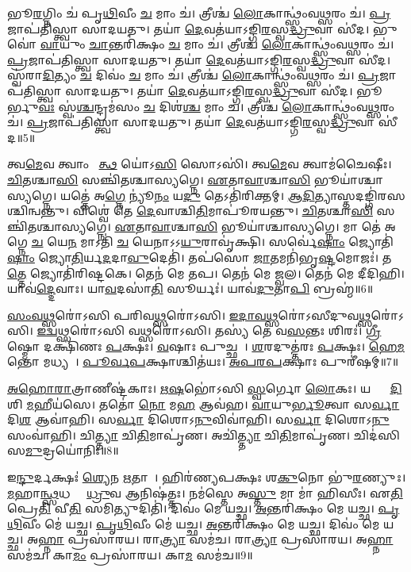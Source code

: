    𑌭𑍂\ul{𑌰}𑌗𑍍𑌨𑌿𑌂 𑌚॑ 𑌪𑍃\ul{𑌥𑌿}𑌵𑍀𑌂 \ul{𑌚} 𑌮𑌾𑌂 𑌚॑।
   𑌤𑍍𑌰𑍀𑌶𑍍𑌚॑ \ul{𑌲𑍋}𑌕𑌾𑌨𑍍𑌥𑍍𑌸𑌂॑𑌵\ul{𑌥𑍍𑌸}𑌰𑌂 𑌚॑।
   \ul{𑌪𑍍𑌰}𑌜𑌾𑌪॑𑌤𑌿𑌸𑍍𑌤𑍍𑌵𑌾 𑌸𑌾𑌦𑌯𑌤𑍁।
   𑌤𑌯𑌾॑ \ul{𑌦𑍇}𑌵𑌤॑𑌯𑌾𑌽𑌙𑍍𑌗𑌿\ul{𑌰}𑌸𑍍𑌵\ul{𑌦𑍍𑌧𑍍𑌰𑍁}𑌵𑌾 𑌸𑍀॑𑌦।
   𑌭𑍁𑌵𑍋॑ \ul{𑌵𑌾}𑌯𑍁𑌂 \ul{𑌚𑌾}𑌨𑍍𑌤𑌰𑌿॑𑌕𑍍𑌷𑌂 \ul{𑌚} 𑌮𑌾𑌂 𑌚॑।
   𑌤𑍍𑌰𑍀𑌶𑍍𑌚॑ \ul{𑌲𑍋}𑌕𑌾𑌨𑍍𑌥𑍍𑌸𑌂॑𑌵\ul{𑌥𑍍𑌸}𑌰𑌂 𑌚॑।
   \ul{𑌪𑍍𑌰}𑌜𑌾𑌪॑𑌤𑌿𑌸𑍍𑌤𑍍𑌵𑌾 𑌸𑌾𑌦𑌯𑌤𑍁।
   𑌤𑌯𑌾॑ \ul{𑌦𑍇}𑌵𑌤॑𑌯𑌾𑌽𑌙𑍍𑌗𑌿\ul{𑌰}𑌸𑍍𑌵\ul{𑌦𑍍𑌧𑍍𑌰𑍁}𑌵𑌾 𑌸𑍀॑𑌦।
   𑌸𑍍𑌵॑𑌰𑌾\ul{𑌦𑌿}𑌤𑍍𑌯𑌂 \ul{𑌚} 𑌦𑌿𑌵𑌂॑ \ul{𑌚} 𑌮𑌾𑌂 𑌚॑।
   𑌤𑍍𑌰𑍀𑌶𑍍𑌚॑ \ul{𑌲𑍋}𑌕𑌾𑌨𑍍𑌥𑍍𑌸𑌂॑𑌵\ul{𑌥𑍍𑌸}𑌰𑌂 𑌚॑।
   \ul{𑌪𑍍𑌰}𑌜𑌾𑌪॑𑌤𑌿𑌸𑍍𑌤𑍍𑌵𑌾 𑌸𑌾𑌦𑌯𑌤𑍁।
   𑌤𑌯𑌾॑ \ul{𑌦𑍇}𑌵𑌤॑𑌯𑌾𑌽𑌙𑍍𑌗𑌿\ul{𑌰}𑌸𑍍𑌵\ul{𑌦𑍍𑌧𑍍𑌰𑍁}𑌵𑌾 𑌸𑍀॑𑌦।
   𑌭𑍂𑌰𑍍𑌭𑍁\ul{𑌵𑌃} 𑌸𑍍𑌵॑\ul{𑌶𑍍𑌚}𑌨𑍍𑌦𑍍𑌰𑌮॑𑌸𑌂 \ul{𑌚} 𑌦𑌿𑌶॑\ul{𑌶𑍍𑌚} 𑌮𑌾𑌂 𑌚॑।
   𑌤𑍍𑌰𑍀𑌶𑍍𑌚॑ \ul{𑌲𑍋}𑌕𑌾𑌨𑍍𑌥𑍍𑌸𑌂॑𑌵\ul{𑌥𑍍𑌸}𑌰𑌂 𑌚॑।
   \ul{𑌪𑍍𑌰}𑌜𑌾𑌪॑𑌤𑌿𑌸𑍍𑌤𑍍𑌵𑌾 𑌸𑌾𑌦𑌯𑌤𑍁।
   𑌤𑌯𑌾॑ \ul{𑌦𑍇}𑌵𑌤॑𑌯𑌾𑌽𑌙𑍍𑌗𑌿\ul{𑌰}𑌸𑍍𑌵\ul{𑌦𑍍𑌧𑍍𑌰𑍁}𑌵𑌾 𑌸𑍀॑𑌦॥5॥
   \anuvakamend
   
   𑌤𑍍𑌵\ul{𑌮𑍇}𑌵 𑌤𑍍𑌵𑌾𑌂 𑌵𑍇᳚\ul{𑌤𑍍𑌥} 𑌯𑍋॑𑌽\ul{𑌸𑌿} 𑌸𑍋𑌽𑌸𑌿॑।
   𑌤𑍍𑌵\ul{𑌮𑍇}𑌵 𑌤𑍍𑌵𑌾𑌮॑𑌚𑍈𑌷𑍀𑌃।
   \ul{𑌚𑌿}𑌤𑌶𑍍𑌚𑌾\ul{𑌸𑌿} 𑌸𑌞𑍍𑌚𑌿॑𑌤𑌶𑍍𑌚𑌾𑌸𑍍𑌯𑌗𑍍𑌨𑍇।
   \ul{𑌏}𑌤𑌾\ul{𑌵𑌾}\ul{}𑌶𑍍𑌚𑌾\ul{𑌸𑌿} 𑌭𑍂𑌯𑌾॑𑌶𑍍𑌚𑌾𑌸𑍍𑌯𑌗𑍍𑌨𑍇।
   𑌯𑌤𑍍𑌤𑍇॑ 𑌅\ul{𑌗𑍍𑌨𑍇} 𑌨𑍍𑌯𑍂॑\ul{𑌨𑌂} 𑌯\ul{𑌦𑍁} 𑌤𑍇𑌽𑌤𑌿॑𑌰𑌿𑌕𑍍𑌤𑌮𑍍।
   \ul{𑌆}\ul{𑌦𑌿}𑌤𑍍𑌯𑌾𑌸𑍍𑌤𑌦𑌙𑍍𑌗𑌿॑𑌰𑌸\-𑌶𑍍𑌚𑌿𑌨𑍍𑌵𑌨𑍍𑌤𑍁।
   𑌵𑌿𑌶𑍍𑌵𑍇॑ 𑌤𑍇 \ul{𑌦𑍇}𑌵𑌾𑌶𑍍𑌚𑌿\ul{𑌤𑌿}𑌮𑌾𑌪𑍂॑𑌰𑌯𑌨𑍍𑌤𑍁।
   \ul{𑌚𑌿}𑌤𑌶𑍍𑌚𑌾\ul{𑌸𑌿} 𑌸𑌞𑍍𑌚𑌿॑𑌤𑌶𑍍𑌚𑌾𑌸𑍍𑌯𑌗𑍍𑌨𑍇।
   \ul{𑌏}𑌤𑌾\ul{𑌵𑌾}\ul{}𑌶𑍍𑌚𑌾\ul{𑌸𑌿} 𑌭𑍂𑌯𑌾॑𑌶𑍍𑌚𑌾𑌸𑍍𑌯𑌗𑍍𑌨𑍇।
   𑌮𑌾 𑌤𑍇॑ 𑌅𑌗𑍍𑌨𑍇 \ul{𑌚} 𑌯𑍇\ul{𑌨} 𑌮𑌾𑌽𑌤𑌿॑ \ul{𑌚} 𑌯𑍇𑌨𑌾𑌽𑌽\ul{𑌯𑍁}𑌰𑌾𑌵𑍃॑𑌕𑍍𑌷𑌿।
   𑌸𑌰𑍍𑌵𑍇॑\ul{𑌷𑌾𑌂} 𑌜𑍍𑌯𑍋𑌤𑌿॑\ul{𑌷𑌾𑌂} 𑌜𑍍𑌯𑍋\ul{𑌤𑌿}𑌰𑍍𑌯\ul{𑌦}𑌦𑌾\ul{𑌵𑍁}𑌦𑍇𑌤𑌿॑।
   𑌤𑌪॑𑌸𑍋 \ul{𑌜𑌾}𑌤𑌮𑌨𑌿॑𑌭𑍃\ul{𑌷𑍍𑌟}𑌮𑍋𑌜𑌃॑।
   𑌤\ul{𑌤𑍍𑌤𑍇} 𑌜𑍍𑌯𑍋𑌤𑌿॑𑌰𑌿𑌷𑍍𑌟𑌕𑍇।
   𑌤𑍇𑌨॑ 𑌮𑍇 𑌤𑌪।
   𑌤𑍇𑌨॑ 𑌮𑍇 𑌜𑍍𑌵𑌲।
   𑌤𑍇𑌨॑ 𑌮𑍇 𑌦𑍀𑌦𑌿𑌹𑌿।
   𑌯𑌾𑌵॑\ul{𑌦𑍍𑌦𑍇}𑌵𑌾𑌃।
   𑌯𑌾\ul{𑌵}𑌦𑌸𑌾॑\ul{𑌤𑌿} 𑌸𑍂𑌰𑍍𑌯𑌃॑।
   𑌯𑌾𑌵॑\ul{𑌦𑍁}𑌤𑌾\ul{𑌪𑌿} 𑌬𑍍𑌰𑌹𑍍𑌮॑॥6॥
\anuvakamend

   \ul{𑌸𑌂}\ul{𑌵}\ul{𑌥𑍍𑌸}𑌰𑍋॑𑌽𑌸𑌿 𑌪𑌰𑌿𑌵\ul{𑌥𑍍𑌸}𑌰𑍋॑\-𑌽𑌸𑌿।
   \ul{𑌇}\ul{𑌦𑌾}\ul{𑌵}\ul{𑌥𑍍𑌸}𑌰𑍋॑𑌽𑌸𑍀𑌦𑍁𑌵\ul{𑌥𑍍𑌸}𑌰𑍋॑\-𑌽𑌸𑌿।
   \ul{𑌇}\ul{𑌦𑍍𑌵}\ul{𑌥𑍍𑌸}𑌰𑍋॑𑌽𑌸𑌿 𑌵\ul{𑌥𑍍𑌸}𑌰𑍋॑\-𑌽𑌸𑌿।
   𑌤𑌸𑍍𑌯॑ 𑌤𑍇 𑌵\ul{𑌸}𑌨𑍍𑌤𑌃 𑌶𑌿𑌰𑌃॑।
   \ul{𑌗𑍍𑌰𑍀}𑌷𑍍𑌮𑍋 𑌦𑌕𑍍𑌷𑌿॑𑌣𑌃 \ul{𑌪}𑌕𑍍𑌷𑌃।
   \ul{𑌵}𑌷𑌾𑌃 𑌪𑍁𑌚𑍍𑌛𑌮𑍍᳚।
   \ul{𑌶}𑌰𑌦𑍁𑌤𑍍𑌤॑𑌰𑌃 \ul{𑌪}𑌕𑍍𑌷𑌃।
   \ul{𑌹𑍇}\ul{𑌮}𑌨𑍍𑌤𑍋 𑌮𑌧𑍍𑌯𑌮𑍍᳚।
   \ul{𑌪𑍂}\ul{𑌰𑍍𑌵}\ul{𑌪}𑌕𑍍𑌷𑌾𑌶𑍍𑌚𑌿𑌤॑𑌯𑌃।
   \ul{𑌅}\ul{𑌪}\ul{𑌰}\ul{𑌪}𑌕𑍍𑌷𑌾𑌃 𑌪𑍁𑌰𑍀॑𑌷𑌮𑍍॥7॥

   \ul{𑌅}\ul{𑌹𑍋}\ul{𑌰𑌾}𑌤𑍍𑌰𑌾𑌣𑍀𑌷𑍍𑌟॑𑌕𑌾𑌃।
   \ul{𑌋}\ul{𑌷}𑌭𑍋॑𑌽𑌸𑌿 \ul{𑌸𑍍𑌵}𑌰𑍍𑌗𑍋 \ul{𑌲𑍋}𑌕𑌃।
   𑌯𑌸𑍍𑌯𑌾𑌂᳚ \ul{𑌦𑌿}𑌶𑌿 \ul{𑌮}𑌹𑍀𑌯॑𑌸𑍇।
   𑌤𑌤𑍋॑ \ul{𑌨𑍋} 𑌮\ul{𑌹} 𑌆𑌵॑𑌹।
   \ul{𑌵𑌾}𑌯𑍁\ul{𑌰𑍍𑌭𑍂}𑌤𑍍𑌵𑌾 𑌸\ul{𑌰𑍍𑌵𑌾} 𑌦𑌿\ul{𑌶} 𑌆𑌵𑌾॑𑌹𑌿।
   𑌸\ul{𑌰𑍍𑌵𑌾} 𑌦𑌿𑌶𑍋𑌽\ul{𑌨𑍁}𑌵𑌿𑌵𑌾॑𑌹𑌿।
   𑌸\ul{𑌰𑍍𑌵𑌾} 𑌦𑌿𑌶𑍋𑌽\ul{𑌨𑍁}𑌸𑌂𑌵𑌾॑𑌹𑌿।
   𑌚𑌿\ul{𑌤𑍍𑌤𑍍𑌯𑌾} 𑌚𑌿\ul{𑌤𑌿}𑌮𑌾𑌪𑍃॑𑌣।
   𑌅𑌚𑌿॑\ul{𑌤𑍍𑌤𑍍𑌯𑌾}  𑌚𑌿\ul{𑌤𑌿}𑌮𑌾𑌪𑍃॑𑌣।
   𑌚𑌿𑌦॑𑌸𑌿 𑌸\ul{𑌮𑍁}𑌦𑍍𑌰𑌯𑍋॑𑌨𑌿𑌃॥8॥

   𑌇\ul{𑌨𑍍𑌦𑍁}𑌰𑍍𑌦𑌕𑍍𑌷𑌃॑ \ul{𑌶𑍍𑌯𑍇}𑌨 \ul{𑌋}𑌤𑌾𑌵𑌾᳚।
   𑌹𑌿𑌰॑𑌣𑍍𑌯𑌪𑌕𑍍𑌷𑌃 𑌶\ul{𑌕𑍁}𑌨𑍋 𑌭𑍁॑\ul{𑌰}𑌣𑍍𑌯𑍁𑌃।
   \ul{𑌮}𑌹𑌾\ul{𑌨𑍍𑌥𑍍𑌸}𑌧𑌸𑍍𑌥𑍇᳚ \ul{𑌧𑍍𑌰𑍁}𑌵 𑌆𑌨𑌿𑌷॑𑌤𑍍𑌤𑌃।
   𑌨𑌮॑𑌸𑍍𑌤𑍇 𑌅\ul{𑌸𑍍𑌤𑍁} 𑌮𑌾 𑌮𑌾॑ 𑌹𑌿𑌸𑍀𑌃।
   𑌏\ul{𑌤𑌿} 𑌪𑍍𑌰𑍇\ul{𑌤𑌿} 𑌵𑍀\ul{𑌤𑌿} 𑌸𑌮𑌿𑌤𑍍𑌯𑍁𑌦𑌿𑌤𑌿॑।
   𑌦𑌿𑌵𑌂॑ 𑌮𑍇 𑌯𑌚𑍍𑌛।
   \ul{𑌅}𑌨𑍍𑌤𑌰𑌿॑𑌕𑍍𑌷𑌂 𑌮𑍇 𑌯𑌚𑍍𑌛।
   \ul{𑌪𑍃}\ul{𑌥𑌿}𑌵𑍀𑌂 𑌮𑍇॑ 𑌯𑌚𑍍𑌛।
   \ul{𑌪𑍃}\ul{𑌥𑌿}𑌵𑍀𑌂 𑌮𑍇॑ 𑌯𑌚𑍍𑌛।
   \ul{𑌅}𑌨𑍍𑌤𑌰𑌿॑𑌕𑍍𑌷𑌂 𑌮𑍇 𑌯𑌚𑍍𑌛।
   𑌦𑌿𑌵𑌂॑ 𑌮𑍇 𑌯𑌚𑍍𑌛।
   𑌅\ul{𑌹𑍍𑌨𑌾} 𑌪𑍍𑌰𑌸𑌾॑𑌰𑌯।
   𑌰𑌾\ul{𑌤𑍍𑌰𑍍𑌯𑌾} 𑌸𑌮॑𑌚।
   𑌰𑌾\ul{𑌤𑍍𑌰𑍍𑌯𑌾} 𑌪𑍍𑌰𑌸𑌾॑𑌰𑌯।
   𑌅\ul{𑌹𑍍𑌨𑌾} 𑌸𑌮॑𑌚।
   𑌕𑌾\ul{𑌮𑌂} 𑌪𑍍𑌰𑌸𑌾॑𑌰𑌯।
   𑌕𑌾\ul{𑌮}\ul{} 𑌸𑌮॑𑌚॥9॥
   \anuvakamend

